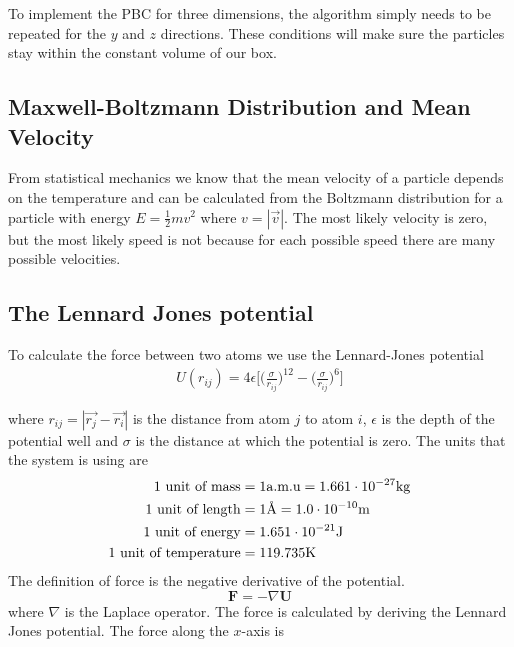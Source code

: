 \documentclass{article}
\begin{document}
\begin{algorithm}[h]
\end{algorithm}
To implement the PBC for three dimensions, the algorithm simply needs to be repeated for the $y$ and $z$ directions. These conditions will make sure the particles stay within the constant volume of our box.


\subsection{Maxwell-Boltzmann Distribution and Mean Velocity}
From statistical mechanics we know that the mean velocity of a particle depends on the temperature and can be calculated from the Boltzmann distribution for a particle with energy $E=\frac{1}{2}mv^2$ where $v=|\vec{v}|$. The most likely velocity is zero, but the most likely speed is not because for each possible speed there are many possible velocities. 




\subsection{The Lennard Jones potential}

To calculate the force between two atoms we use the Lennard-Jones potential
\begin{align}
	U(r_{ij})=4\epsilon\Big[\Big(\frac{\sigma}{r_{ij}}\Big)^{12}-\Big(\frac{\sigma}{r_{ij}}\Big)^{6}\Big]
\end{align}

where $r_{ij}=|\vec{r_j}-\vec{r_i}|$ is the distance from atom $j$ to atom $i$, $\epsilon$ is the depth of the potential well and $\sigma$ is the distance at which the potential is zero. The units that the system is using are
\begin{align*}
	1 \textnormal{ unit of mass} &= 1 \textnormal{a.m.u} = 1.661\cdot 10^{-27} \textnormal{kg}\\
	1 \textnormal{ unit of length} &= 1 \textnormal{Å} = 1.0\cdot 10^{-10} \textnormal{m}\\
	1 \textnormal{ unit of energy} &= 1.651\cdot 10^{-21}\textnormal{J}\\
	1 \textnormal{ unit of temperature} &= 119.735\textnormal{K}
\end{align*}
The definition of force is the negative derivative of the potential.
$$\mathbf{F}=-\nabla \mathbf{U}$$
where $\nabla$ is the Laplace operator.
The force is calculated by deriving the Lennard Jones potential. The force along the $x$-axis is
\end{document}
